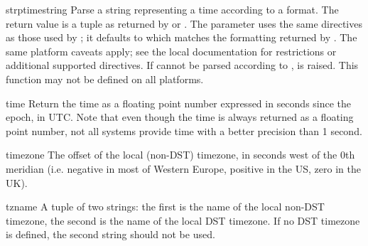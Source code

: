 \begin{funcdesc}{strptime}{string}
Parse a string representing a time according to a format.  The return 
value is a tuple as returned by  or
.  The  parameter uses the same
directives as those used by ; it defaults to
 which matches the formatting
returned by .  The same platform caveats apply; see
the local \UNIX{} documentation for restrictions or additional
supported directives.  If  cannot be parsed according to
,  is raised.  This function may not
be defined on all platforms.
\end{funcdesc}

\begin{funcdesc}{time}{}
Return the time as a floating point number expressed in seconds since
the epoch, in UTC.  Note that even though the time is always returned
as a floating point number, not all systems provide time with a better
precision than 1 second.
\end{funcdesc}

\begin{datadesc}{timezone}
The offset of the local (non-DST) timezone, in seconds west of the 0th
meridian (i.e. negative in most of Western Europe, positive in the US,
zero in the UK).
\end{datadesc}

\begin{datadesc}{tzname}
A tuple of two strings: the first is the name of the local non-DST
timezone, the second is the name of the local DST timezone.  If no DST
timezone is defined, the second string should not be used.
\end{datadesc}

